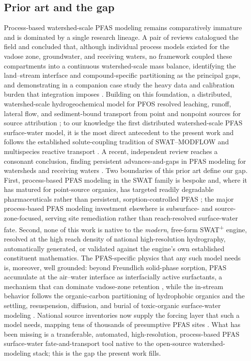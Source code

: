 \subsection{Prior art and the gap}
Process-based watershed-scale PFAS modeling remains comparatively immature and is dominated by a single research lineage. A pair of reviews catalogued the field and concluded that, although individual process models existed for the vadose zone, groundwater, and receiving waters, no framework coupled these compartments into a continuous watershed-scale mass balance, identifying the land--stream interface and compound-specific partitioning as the principal gaps, and demonstrating in a companion case study the heavy data and calibration burden that integration imposes \citep{raschke2022overview,raschke2022case}. Building on this foundation, a distributed, watershed-scale hydrogeochemical model for PFOS resolved leaching, runoff, lateral flow, and sediment-bound transport from point and nonpoint sources for source attribution \citep{rafiei2023}; to our knowledge the first distributed watershed-scale PFAS surface-water model, it is the most direct antecedent to the present work and follows the established solute-coupling tradition of SWAT--MODFLOW \citep{bailey2016} and multispecies reactive transport \citep{clement1998}. A recent, independent review reaches a consonant conclusion, finding persistent advances-and-gaps in PFAS modeling for watersheds and receiving waters \citep{zhang2025}. Two boundaries of this prior art define our gap. First, process-based PFAS modeling in the SWAT family is bespoke and, where it has matured for point-source organics, has targeted readily degradable pharmaceuticals rather than persistent, sorption-controlled PFAS \citep{salo2025}; the major process-based PFAS modeling investment elsewhere is subsurface- and source-zone-focused, serving site remediation rather than reach-resolved surface-water fate. Second, none of this work is native to the \emph{modern}, free-form SWAT\textsuperscript{+} engine, resolved at the high reach density of national high-resolution hydrography, automatically generated, or validated against the engine's own established constituent mathematics. The PFAS-specific physics that any such model needs is, moreover, well grounded: beyond Freundlich solid-phase sorption, PFAS accumulate at the air--water interface as interfacially active surfactants, a mechanism that can dominate vadose-zone retention \citep{brusseau2018,guo2020}, while the in-stream behavior follows the organic-carbon partitioning of hydrophobic organics \citep{karickhoff1979} and the settling, resuspension, diffusion, and burial of toxic-organic surface-water modeling \citep{chapra1997}. National source inventories now supply the forcing layer that such a model needs, mapping tens of thousands of presumptive PFAS sites \citep{salvatore2022}. What has been missing is a transferable, automated, high-resolution, process-based PFAS surface-water fate-and-transport tool native to the open-source watershed-modeling stack; this is the gap the present work fills.

